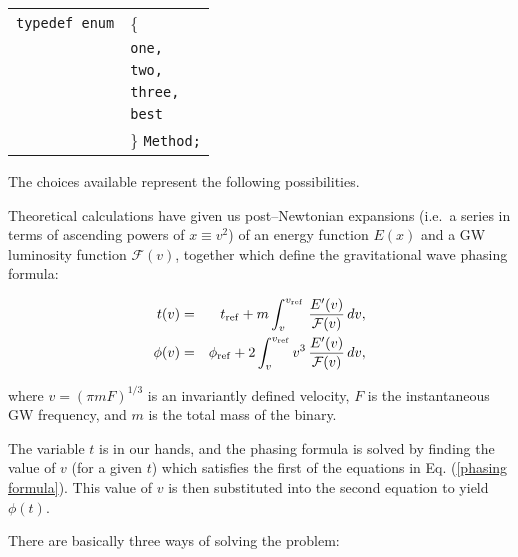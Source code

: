 \documentclass[12pt]{article}
\begin{document}
\vspace{5mm}

\begin{tabular}{ll}
\texttt{typedef enum} & \{ \\
                      & \texttt{one,} \\
                      & \texttt{two,}  \\
                      & \texttt{three,} \\
                      & \texttt{best} \\
                      & \} \texttt{Method;}
\end{tabular}

\vspace{5mm}


The choices available represent the following possibilities.

Theoretical calculations have given us post--Newtonian expansions (i.e.\ a series in terms of ascending powers of $x\equiv v^{2}$) of an energy function $E(x)$ and a GW luminosity function $\mathcal{F}(v)$, together which define the gravitational wave phasing formula:

\begin{eqnarray}
t(v) & = & t_{\rm ref} + m \int_v^{v_{\rm ref}} \, 
\frac{E'(v)}{{\cal F}(v)} \, dv, \nonumber \\ 
\phi (v) & = & \phi_{\rm ref} + 2 \int_v^{v_{\rm ref}}  v^3 \, 
\frac{E'(v)}{{\cal F}(v)} \, dv,
\label{phasing formula}
\end{eqnarray}

where $v=(\pi m F)^{1/3}$ is an invariantly defined velocity, $F$ is the instantaneous GW frequency, and $m$ is the total mass of the binary. 

The variable $t$ is in our hands, and the phasing formula is solved by finding the value of $v$ (for a given $t$) which satisfies the first of the equations in Eq. (\ref{phasing formula}). This value of $v$ is then substituted into the second equation to yield $\phi(t)$.

There are basically three ways of solving the problem:
\end{document}
